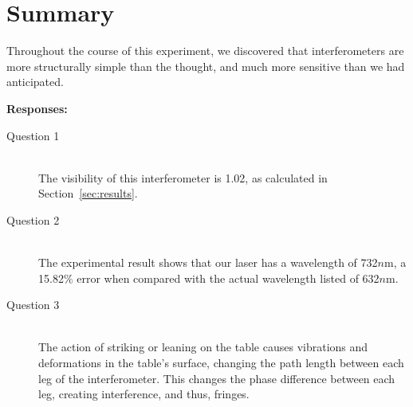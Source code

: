 \section{Summary}

Throughout the course of this experiment, we discovered that interferometers are
more structurally simple than the thought, and much more sensitive than we had
anticipated.   

\textbf{Responses:}\\
\begin{description}
    \item[Question 1] \hfill \\
        The visibility of this interferometer is 1.02, as calculated in
        Section~\ref{sec:results}.
    \item[Question 2] \hfill \\
        The experimental result shows that our laser has a wavelength of
        732$n$m, a 15.82\% error when compared with the actual wavelength listed
        of 632$n$m.
    \item[Question 3] \hfill \\
        The action of striking or leaning on the table causes vibrations and
        deformations in the table's surface, changing the path length between
        each leg of the interferometer. This changes the phase difference
        between each leg, creating interference, and thus, fringes.
\end{description}
